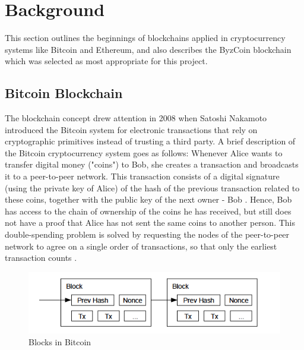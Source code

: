 \section{Background} \label{Background}

This section outlines the beginnings of blockchains applied in cryptocurrency systems like Bitcoin and Ethereum, and also describes the ByzCoin blockchain which was selected as most appropriate for this project.

\subsection{Bitcoin Blockchain} \label{Bitcoin}
The blockchain concept drew attention in 2008 when Satoshi Nakamoto introduced the Bitcoin \cite{Bitcoin} system for electronic transactions that rely on cryptographic primitives instead of trusting a third party. A brief description of the Bitcoin cryptocurrency system goes as follows:
\newline
Whenever Alice wants to transfer digital money ("coins") to Bob, she creates a transaction and broadcasts it to a peer-to-peer network. This transaction consists of a digital signature (using the private key of Alice) of the hash of the previous transaction related to these coins, together with the public key of the next owner - Bob \cite{Bitcoin}.
\newline
Hence, Bob has access to the chain of ownership of the coins he has received, but still does not have a proof that Alice has not sent the same coins to another person. This double-spending problem is solved by requesting the nodes of the peer-to-peer network to agree on a single order of transactions, so that only the earliest transaction counts \cite{Bitcoin}.
\begin{figure}[H]
    \centering
    \includegraphics[width=1\textwidth]{Figures/blocks_bitcoin.png}
    \caption{Blocks in Bitcoin \cite{Bitcoin}}
    \label{Blocks in Bitcoin}
\end{figure}
\noindent
